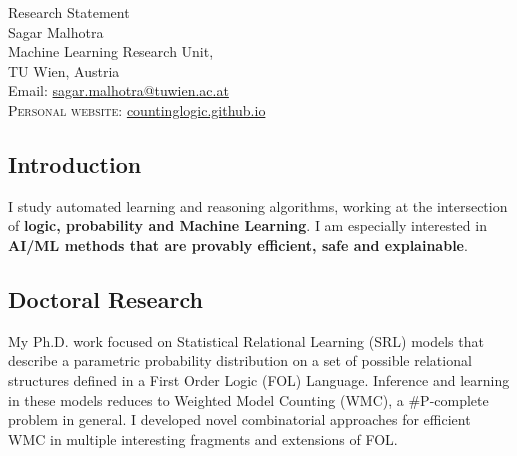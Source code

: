 \documentclass[10pt, a4paper]{article}
\begin{document}
{\LARGE Research Statement}\\[0.2cm]
Sagar Malhotra\\
Machine Learning Research Unit,\\
TU Wien, Austria\\ 
Email: \href{mailto:sagar.malhotra@tuwien.ac.at}{sagar.malhotra@tuwien.ac.at}\\
\textsc{Personal website}: \href{https://countinglogic.github.io}{countinglogic.github.io}

\subsection*{Introduction}
\noindent
I study automated learning and reasoning algorithms, working at the intersection of \textbf{logic, probability and Machine Learning}. I am especially interested in \textbf{AI/ML methods that are provably efficient, safe and explainable}.

\subsection*{Doctoral Research}
My Ph.D. work focused on Statistical Relational Learning (SRL)  models that describe a parametric probability distribution on a set of possible relational structures defined in a First Order Logic (FOL) Language. Inference and learning in these models reduces to Weighted Model Counting (WMC), a $\#\mathrm{P}$-complete problem in general. I developed novel combinatorial approaches for efficient WMC in multiple interesting fragments and extensions of FOL. 
\end{document}
